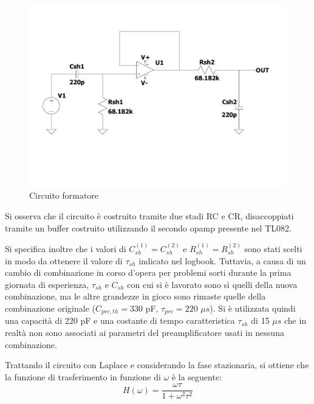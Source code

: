 \documentclass{article}
\begin{document}
\begin{center}
    \begin{figure}[H]
    \centering
    \includegraphics[scale=0.3, angle=0]{shaper.pdf}
    \caption{Circuito formatore}
    \label{fig:shaper}
    \end{figure}
\end{center}
    
Si osserva che il circuito è costruito tramite due stadi RC e CR, disaccoppiati tramite un buffer costruito utilizzando il secondo 
opamp presente nel TL082.

Si specifica inoltre che i valori di $C_{sh}^{(1)}=C_{sh}^{(2)}$ e $R_{sh}^{(1)}=R_{sh}^{(2)}$ sono stati scelti in modo da ottenere 
il valore di $\tau_{sh}$ indicato nel logbook. Tuttavia, a causa di un cambio di combinazione in corso d'opera per problemi sorti durante la 
prima giornata di esperienza, $\tau_{sh}$ e $C_{sh}$ con cui si è lavorato sono sì quelli della nuova combinazione, ma le altre grandezze in gioco sono rimaste quelle
della combinazione originale ($C_{pre,th}=330$ pF, $\tau_{pre}=220$ $\mu s$). Si è utilizzata quindi una capacità di 220 pF
e una costante di tempo caratteristica $\tau_{sh}$ di 15 $\mu s$ che in realtà non sono associati ai parametri del preamplificatore usati in nessuna combinazione.

Trattando il circuito con Laplace e considerando la fase stazionaria, si ottiene che la funzione di trasferimento in funzione di 
$\omega$ è la seguente:
\begin{equation}
H(\omega)=\frac{\omega \tau}{1+\omega^2\tau^2}
\end{equation}
\end{document}
